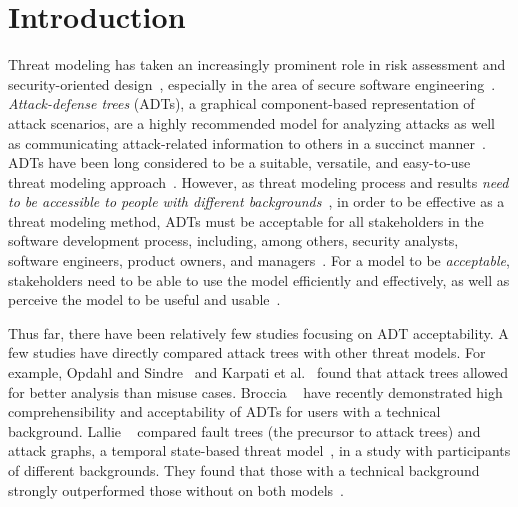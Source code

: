 


\section{Introduction}
\label{sec:introduction}


Threat modeling has taken an increasingly prominent role in risk assessment and security-oriented design~\cite{andersonSecurityEngineeringGuide2020}, especially in the area of secure software engineering~\cite{yskout2020threat,howard2003inside,apvrille2005secure}. \emph{Attack-defense trees} (ADTs), a graphical component-based representation of attack scenarios, are a highly recommended model for analyzing attacks as well as communicating attack-related information to others in a succinct manner~\cite{andersonSecurityEngineeringGuide2020,ncsc2023attacktrees}. ADTs have been long considered to be a suitable, versatile, and easy-to-use threat modeling approach~\cite{schneierSecretsLiesDigital2000,shostack2014threat,tarandach2020threat,saini2008threat,shevchenko2018threat,apvrille2005secure,stringhini2021adversarial,ncsc2023attacktrees,reversinglabs2024attacktrees}. However, as threat modeling process and results \emph{need to be accessible to people with different backgrounds}~\cite{dev2023models,brunner2020risk}, in order to be effective as a threat modeling method, ADTs must be acceptable for all stakeholders in the software development process, including, among others, security analysts, software engineers, product owners, and managers~\cite{verreydt2024threat}. For a model to be \emph{acceptable}, stakeholders need to be able to use the model efficiently and effectively, as well as perceive the model to be useful and usable~\cite{moodyMethodEvaluationModel2003}.

Thus far, there have been relatively few studies focusing on ADT acceptability. A few studies have directly compared attack trees with other threat models. For example, Opdahl and Sindre~\cite{opdahlExperimentalComparisonAttack2009} and Karpati et al.~\cite{karpatiComparingAttackTrees2014} found that attack trees allowed for better analysis than misuse cases. Broccia \etal~\cite{broccia_assessing_2024,broccia2025evaluating} have recently demonstrated high comprehensibility and acceptability of ADTs for users with a technical background. Lallie \etal~\cite{lallieEmpiricalEvaluationEffectiveness2017} compared fault trees (the precursor to attack trees) and attack graphs, a temporal state-based threat model~\cite{schieleNovelApproachAttack2021}, in a study with participants of different backgrounds. They found that those with a technical background strongly outperformed those without on both models~\cite{lallieEmpiricalEvaluationEffectiveness2017}.  


